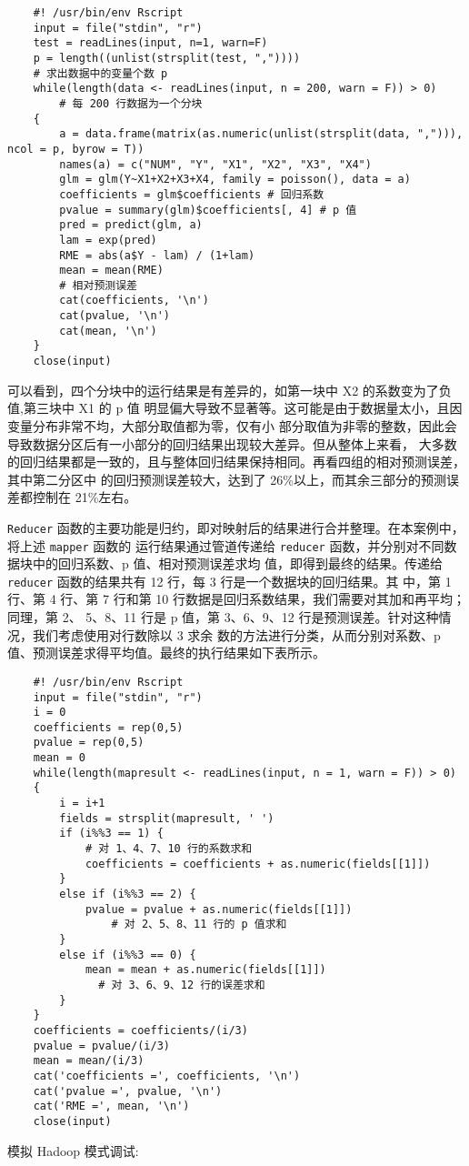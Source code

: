 \begin{lstlisting}
	#! /usr/bin/env Rscript
	input = file("stdin", "r")
	test = readLines(input, n=1, warn=F)
	p = length((unlist(strsplit(test, ","))))
	# 求出数据中的变量个数 p
	while(length(data <- readLines(input, n = 200, warn = F)) > 0)
	    # 每 200 行数据为一个分块
	{
	    a = data.frame(matrix(as.numeric(unlist(strsplit(data, ","))), ncol = p, byrow = T))
	    names(a) = c("NUM", "Y", "X1", "X2", "X3", "X4")
	    glm = glm(Y~X1+X2+X3+X4, family = poisson(), data = a)
	    coefficients = glm$coefficients # 回归系数
	    pvalue = summary(glm)$coefficients[, 4] # p 值
	    pred = predict(glm, a)
	    lam = exp(pred)
	    RME = abs(a$Y - lam) / (1+lam)
	    mean = mean(RME)
	    # 相对预测误差
	    cat(coefficients, '\n')
	    cat(pvalue, '\n')
	    cat(mean, '\n')
	}
	close(input)
\end{lstlisting}

可以看到，四个分块中的运行结果是有差异的，如第一块中 X2
的系数变为了负值,第三块中 X1 的 p 值
明显偏大导致不显著等。这可能是由于数据量太小，且因变量分布非常不均，大部分取值都为零，仅有小
部分取值为非零的整数，因此会导致数据分区后有一小部分的回归结果出现较大差异。但从整体上来看，
大多数的回归结果都是一致的，且与整体回归结果保持相同。再看四组的相对预测误差，其中第二分区中
的回归预测误差较大，达到了 26\%以上，而其余三部分的预测误差都控制在
21\%左右。

\lstinline!Reducer!
函数的主要功能是归约，即对映射后的结果进行合并整理。在本案例中，将上述
\lstinline!mapper! 函数的 运行结果通过管道传递给 \lstinline!reducer!
函数，并分别对不同数据块中的回归系数、p 值、相对预测误差求均
值，即得到最终的结果。传递给 \lstinline!reducer! 函数的结果共有 12 行，每 3
行是一个数据块的回归结果。其 中，第 1 行、第 4 行、第 7 行和第 10
行数据是回归系数结果，我们需要对其加和再平均；同理，第 2、 5、8、11 行是 p
值，第 3、6、9、12 行是预测误差。针对这种情况，我们考虑使用对行数除以 3
求余 数的方法进行分类，从而分别对系数、p
值、预测误差求得平均值。最终的执行结果如下表所示。

\begin{lstlisting}
	#! /usr/bin/env Rscript
	input = file("stdin", "r")
	i = 0
	coefficients = rep(0,5)
	pvalue = rep(0,5)
	mean = 0
	while(length(mapresult <- readLines(input, n = 1, warn = F)) > 0)
	{
	    i = i+1
	    fields = strsplit(mapresult, ' ')
	    if (i%%3 == 1) {
	        # 对 1、4、7、10 行的系数求和
	        coefficients = coefficients + as.numeric(fields[[1]])
	    }
	    else if (i%%3 == 2) {
	        pvalue = pvalue + as.numeric(fields[[1]])
	            # 对 2、5、8、11 行的 p 值求和
	    }
	    else if (i%%3 == 0) {
	        mean = mean + as.numeric(fields[[1]])
	          # 对 3、6、9、12 行的误差求和
	    }
	}
	coefficients = coefficients/(i/3)
	pvalue = pvalue/(i/3)
	mean = mean/(i/3)
	cat('coefficients =', coefficients, '\n')
	cat('pvalue =', pvalue, '\n')
	cat('RME =', mean, '\n')
	close(input)
\end{lstlisting}
模拟 Hadoop 模式调试:

